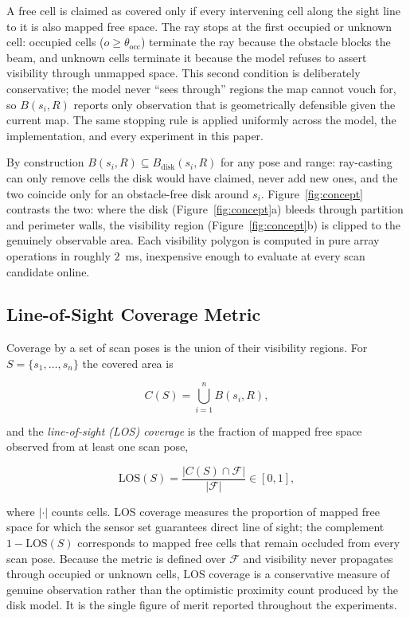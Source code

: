 \documentclass[sensors,article,submit,pdftex,moreauthors]{Definitions/mdpi}
\begin{document}
A free cell is claimed as covered only if every intervening cell along the sight
line to it is also mapped free space. The ray stops at the first occupied or
unknown cell: occupied cells ($o\ge\theta_{\mathrm{occ}}$) terminate the ray
because the obstacle blocks the beam, and unknown cells terminate it because the
model refuses to assert visibility through unmapped space. This second condition
is deliberately conservative; the model never ``sees through'' regions the map
cannot vouch for, so $B(s_i,R)$ reports only observation that is geometrically
defensible given the current map. The same stopping rule is applied uniformly
across the model, the implementation, and every experiment in this paper.

By construction $B(s_i,R)\subseteq B_{\mathrm{disk}}(s_i,R)$ for any pose and
range: ray-casting can only remove cells the disk would have claimed, never add
new ones, and the two coincide only for an obstacle-free disk around $s_i$.
Figure~\ref{fig:concept} contrasts the two: where the disk
(Figure~\ref{fig:concept}a) bleeds through partition and perimeter walls, the
visibility region (Figure~\ref{fig:concept}b) is clipped to the genuinely
observable area. Each visibility polygon is computed in pure array operations in
roughly $2$~ms, inexpensive enough to evaluate at every scan candidate online.

\subsection{Line-of-Sight Coverage Metric}
\label{sec:los}

Coverage by a set of scan poses is the union of their visibility regions. For
$S=\{s_1,\dots,s_n\}$ the covered area is

\begin{equation}
C(S)=\bigcup_{i=1}^{n} B(s_i,R),
\end{equation}

and the \emph{line-of-sight (LOS) coverage} is the fraction of mapped free space
observed from at least one scan pose,

\begin{equation}
\mathrm{LOS}(S)=\frac{\lvert C(S)\cap\mathcal{F}\rvert}{\lvert\mathcal{F}\rvert}\in[0,1],
\end{equation}

where $\lvert\cdot\rvert$ counts cells. LOS coverage measures the proportion of
mapped free space for which the sensor set guarantees direct line of sight; the
complement $1-\mathrm{LOS}(S)$ corresponds to mapped free cells that remain
occluded from every scan pose. Because the metric is defined over $\mathcal{F}$
and visibility never propagates through occupied or unknown cells, LOS coverage
is a conservative measure of genuine observation rather than the optimistic
proximity count produced by the disk model. It is the single figure of merit
reported throughout the experiments.
\end{document}
